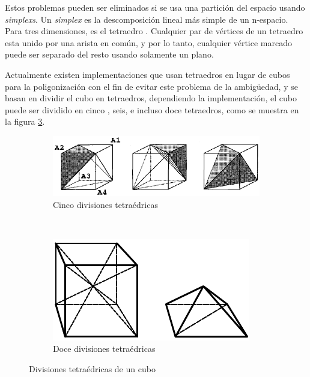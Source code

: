 Estos problemas pueden ser eliminados si se usa una partición del espacio usando \emph{simplexs}.
Un \emph{simplex} es la descomposición lineal más simple de un n-espacio. Para tres dimensiones, es el tetraedro \cite{Bloomenthal88polygonizationof}. Cualquier par de vértices de un tetraedro esta unido por una arista en común, y por lo tanto, cualquier vértice marcado puede ser separado del resto usando solamente un plano.

Actualmente existen implementaciones que usan tetraedros en lugar de cubos para la poligonización con el fin de evitar este problema de la ambigüedad, y se basan en dividir el cubo en tetraedros, dependiendo la implementación, el cubo puede ser dividido en cinco \cite{BAPayne90surfacemapping}, seis, e incluso doce \cite{Bloomenthal88polygonizationof} tetraedros, como se muestra en la figura \ref{f:estadoDelArte:divisionesTetraedricasDeUnCubo}.

\begin{figure}[h]

	\begin{subfigure}[b]{0.45\textwidth}
		\centering
		\includegraphics[width=\textwidth]{images/marchingcubes/GueziecHummel95exploitingtriangulated_1.png}
		\caption{Cinco divisiones tetraédricas}
		\label{f:estadoDelArte:cincoDivisionesTetraedricas}
	\end{subfigure}
	~
	\begin{subfigure}[b]{0.45\textwidth}
		\centering
		\includegraphics[width=\textwidth]{images/marchingcubes/Bloomenthal88polygonizationof_2.png}
		\caption{Doce divisiones tetraédricas}
		\label{f:estadoDelArte:doceDivisionesTetraedricas}
	\end{subfigure}

	\caption{Divisiones tetraédricas de un cubo}
	\label{f:estadoDelArte:divisionesTetraedricasDeUnCubo}
\end{figure}

